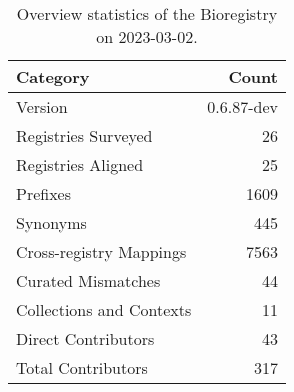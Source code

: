 \begin{table}
\centering
\caption{Overview statistics of the Bioregistry on 2023-03-02.}
\label{tab:bioregistry-summary}
\begin{tabular}{lr}
\toprule
                Category &      Count \\
\midrule
                 Version & 0.6.87-dev \\
     Registries Surveyed &         26 \\
      Registries Aligned &         25 \\
                Prefixes &       1609 \\
                Synonyms &        445 \\
 Cross-registry Mappings &       7563 \\
      Curated Mismatches &         44 \\
Collections and Contexts &         11 \\
     Direct Contributors &         43 \\
      Total Contributors &        317 \\
\bottomrule
\end{tabular}
\end{table}
